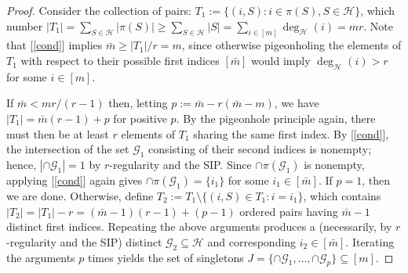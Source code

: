 \documentclass[9pt,twocolumn]{pnas-new}
\renewcommand{\eqref}[1]{\textnormal{[\ref{#1}]}}
\begin{document}
\begin{proof}
Consider the collection of pairs: $T_1 := \{(i, S): i \in \pi(S), S \in \mathcal{H}\}$, which number $|T_1| = \sum_{S \in \mathcal{H}} |\pi(S)| \geq \sum_{S \in \mathcal{H}} |S| = \sum_{i \in [m]} \deg_\mathcal{H}(i) = mr$. Note that \eqref{cond} implies $\bar m \geq |T_1| / r = m$, since otherwise pigeonholing the elements of $T_1$ with respect to their possible first indices $[\bar m]$ would imply $\deg_\mathcal{H}(i) > r$ for some $i \in [m]$.

If $\bar m < mr / (r-1)$ then, letting $p := \bar m - r( \bar m - m)$, we have $|T_1| = \bar m (r - 1) + p$ for positive $p$. By the pigeonhole principle again, there must then be at least $r$ elements of $T_1$ sharing the same first index. By \eqref{cond}, the intersection of the set $\mathcal{G}_1$ consisting of their second indices is nonempty; hence, $|\cap \mathcal{G}_1| = 1$ by $r$-regularity and the SIP. Since $\cap \pi(\mathcal{G}_1)$ is nonempty, applying \eqref{cond} again gives $\cap \pi(\mathcal{G}_1) = \{i_1\}$ for some $i_1 \in [\bar m]$. If $p=1$, then we are done. Otherwise, define $T_2 := T_1 \setminus \{(i,S) \in T_1: i = i_1\}$, which contains $|T_2| = |T_1| - r = (\bar m - 1)(r-1) + (p-1)$ ordered pairs having $\bar m - 1$ distinct first indices. Repeating the above arguments produces a (necessarily, by $r$-regularity and the SIP) distinct $\mathcal{G}_2 \subseteq \mathcal{H}$ and corresponding $i_2 \in [\bar m]$. Iterating the arguments $p$ times yields the set of singletons \mbox{$J = \{\cap \mathcal{G}_1, \ldots, \cap \mathcal{G}_p\} \subseteq [m]$}.
\end{proof}
\end{document}
